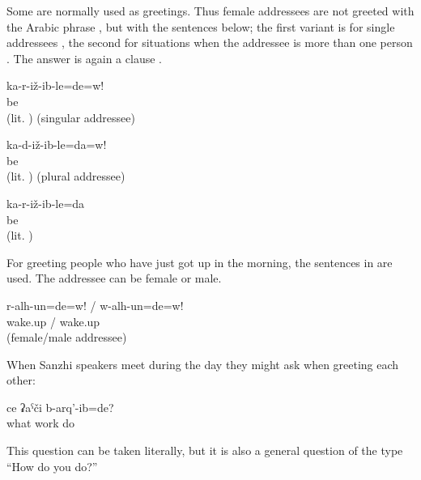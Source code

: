Some  are normally used as greetings. Thus female addressees are not greeted with the Arabic phrase , but with the sentences below; the first variant is for single addressees , the second for situations when the addressee is more than one person . The answer is again a clause .
%
\begin{exe}
	\ex	\label{ex:Are you sitting? I am sitting}
	\begin{xlist}
		\ex	\label{ex:Are you sitting? I am sitting@A}
		\gll	ka-r-iž-ib-le=de=w!	\\
			be		\\
		\glt	{} (lit. ) (singular addressee)

		\ex	\label{ex:Are you sitting? I am sitting@C}
		\gll		ka-d-iž-ib-le=da=w!\\
			 be	\\
		\glt	{} (lit. ) (plural addressee)
		
		\ex	\label{ex:Are you sitting? I am sitting@B}
		\gll	ka-r-iž-ib-le=da\\
			be\\
		\glt	{} (lit. )
	\end{xlist}
\end{exe}

For greeting people who have just got up in the morning, the sentences in  are used. The addressee can be female or male.
%
\begin{exe}
	\ex	\label{ex:Good morning}
	\gll	r-alh-un=de=w!	/	w-alh-un=de=w!\\
		wake.up	/	wake.up\\
	\glt	{} (female\slash male addressee)
\end{exe}

When Sanzhi speakers meet during the day they might ask when greeting each other:
%
\begin{exe}
	\ex	\label{ex:What (work) have you done?}
	\gll	ce	ʡaˁči	b-arq'-ib=de?\\
		what	work	do\\
	\glt	{}
\end{exe}

This question can be taken literally, but it is also a general question of the type ``How do you do?''

